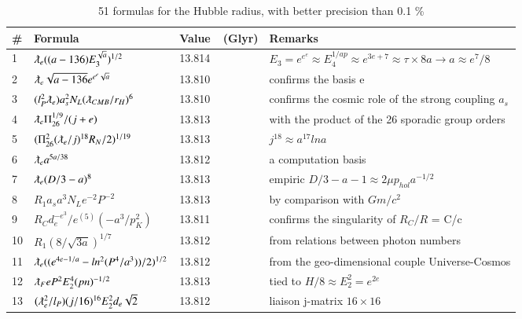 \documentclass[a4paper,9pt]{article}
\begin{document}
\begin{appendix}
\begin{table}
\begin{tabular}{llll}
    \bottomrule
  \end{tabular}
\end{table}



\begin{table}
\caption{51 formulas for the Hubble radius, with better precision than 0.1 \%}
\label{tab:5:table5}
  \hskip-2.0cm\begin{tabular}{llll}
    \toprule
    \cmidrule(r){1-4}
   \#     & Formula     & Value~~(Glyr) & Remarks \\
    \midrule
    
   1 & $\lambdabar_{e} ((a-136)E_3^{\sqrt a})^{1/2}$ & 13.814 & $E_3 = e^{e^e} \approx E_4^{1/ap} \approx e^{3e+7}\approx \tau \times 8a \rightarrow a\approx e^7/8$ \\
   2 & $ \lambdabar_{e} \sqrt{a -136} e^{e^e \sqrt a}$ & 13.810 & confirms the basis e \\
   3 & $(l_P^2 \lambdabar_{e})a_s^2 N_L (\lambdabar_{CMB}/r_H)^6$ & 13.810 & confirms the cosmic role of the strong coupling $a_s$ \\
   4 & $\lambdabar_{e} \Pi_{26}^{1/9}/(j+e)$ & 13.813 & with the product of the 26 sporadic group orders\\
   5 & $(\Pi_{26}^2(\lambdabar_e/j)^{18}R_N/2)^{1/19}$ & 13.813 & $j^{18} \approx a^{17} lna$\\
   6 & $\lambdabar_{e} a^{5a/38}$ & 13.812 & a computation basis\\
   7 & $\lambdabar_{e} (D/3 - a)^8$ & 13.813 & empiric $D/3 -a -1 \approx 2\mu p_{hol}a^{-1/2}$\\ 
   8 & $R_1 a_s a^3 N_L e^{-2}P^{-2}$ & 13.813 & by comparison with $Gm/c^2$\\
   9 & $R_C d_e^{-e^3}/e^{(5)}(-a^3/p_K^2)$ & 13.811 & confirms the singularity of $R_C/R$ = C/c\\
  10 & $R_1 (8/\sqrt{3a})^{1/7}$ & 13.812 & from relations between photon numbers \\
   11 & $\lambdabar_{e} ((e^{4e-1/a} - ln^2(P^4/a^3))/2)^{1/2}$ & 13.812 & from the geo-dimensional couple Universe-Cosmos\\
   12 & $\lambdabar_{F} e P^2E_2^4(pn)^{-1/2}$ & 13.813 &tied to $H/8 \approx E_2^2 = e^{2e}$\\
   13 & $(\lambdabar_{e}^2/l_P) (j/16)^{16}E_2^2 d_e \sqrt 2$ & 13.812 & liaison j-matrix $16 \times 16$\\

\end{tabular}
\end{table}
\end{appendix}
\end{document}
